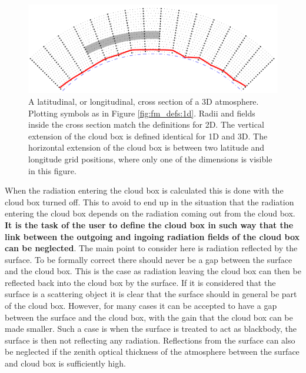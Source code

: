 
\begin{figure}[!t]
 \begin{center}
  \includegraphics*[width=0.98\hsize]{atm_dim_3dcross}
  \caption{A latitudinal, or longitudinal, cross section of a 3D atmosphere. 
    Plotting symbols as in Figure \ref{fig:fm_defs:1d}. Radii and
    fields inside the cross section match the definitions for 2D.
    The vertical extension
    of the cloud box is defined identical for 1D and 3D. The horizontal 
    extension of the cloud box is between two latitude and longitude grid
    positions, where only one of the dimensions is visible in this figure.}
  \label{fig:fm_defs:3dcross}
 \end{center}
\end{figure}

When the radiation entering the cloud box is calculated this is done
with the cloud box turned off. This to avoid to end up in the
situation that the radiation entering the cloud box depends on the
radiation coming out from the cloud box. {\bf It is the task of the
  user to define the cloud box in such way that the link between the
  outgoing and ingoing radiation fields of the cloud box can be
  neglected}. The main point to consider here is radiation reflected
by the surface. To be formally correct there should never be a gap
between the surface and the cloud box. This is the case as radiation
leaving the cloud box can then be reflected back into the cloud box by
the surface. If it is considered that the surface is a scattering object
it is clear that the surface should in general be part of the cloud
box. However, for many cases it can be accepted to have a gap between
the surface and the cloud box, with the gain that the cloud box can be
made smaller. Such a case is when the surface is treated to act as
blackbody, the surface is then not reflecting any radiation.
Reflections from the surface can also be neglected if the zenith
optical thickness of the atmosphere between the surface and cloud box
is sufficiently high.



